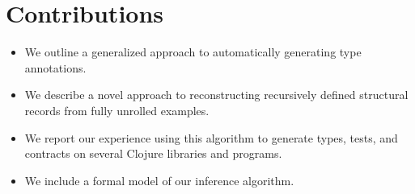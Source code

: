%
%
%



\section*{Contributions}
\begin{itemize}
\item We outline a generalized approach to automatically
    generating type annotations.
\item
  We describe a novel approach to reconstructing recursively
  defined structural records from fully unrolled examples.
\item
  We report our experience using this algorithm to generate
  types, tests, and contracts on several
  Clojure libraries and programs.
\item
  We include a formal model of our inference algorithm.
\end{itemize}
